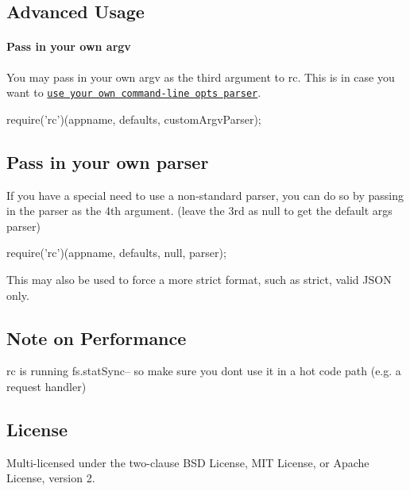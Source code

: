 \subsection*{Advanced Usage}

\paragraph*{Pass in your own {\ttfamily argv}}

You may pass in your own {\ttfamily argv} as the third argument to {\ttfamily rc}. This is in case you want to \href{https://github.com/dominictarr/rc/pull/12}{\tt use your own command-\/line opts parser}.


\begin{DoxyCode}
require('rc')(appname, defaults, customArgvParser);
\end{DoxyCode}


\subsection*{Pass in your own parser}

If you have a special need to use a non-\/standard parser, you can do so by passing in the parser as the 4th argument. (leave the 3rd as null to get the default args parser)


\begin{DoxyCode}
require('rc')(appname, defaults, null, parser);
\end{DoxyCode}


This may also be used to force a more strict format, such as strict, valid J\+S\+ON only.

\subsection*{Note on Performance}

{\ttfamily rc} is running {\ttfamily fs.\+stat\+Sync}-- so make sure you don\textquotesingle{}t use it in a hot code path (e.\+g. a request handler)

\subsection*{License}

Multi-\/licensed under the two-\/clause B\+SD License, M\+IT License, or Apache License, version 2. 